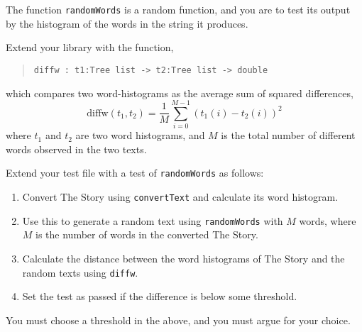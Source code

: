 The function \lstinline{randomWords} is a random function, and you are
to test its output by the histogram of the words in the string it
produces.

Extend your library with the function,
\begin{quote}
  \mbox{\lstinline!diffw : t1:Tree list -> t2:Tree list -> double!}
\end{quote}
which compares two word-histograms as the average sum of squared differences,
\begin{equation}
  \text{diffw}(t_1, t_2) = \frac{1}{M}\sum_{i=0}^{M-1}\left(t_1(i) - t_2(i)\right)^2
\end{equation}
where $t_1$ and $t_2$ are two word histograms, and $M$ is the total
number of different words observed in the two texts.

Extend your test file with a test of \lstinline{randomWords}
as follows:
\begin{enumerate}
\item Convert The Story using \lstinline{convertText} and calculate
  its word histogram.
\item Use this to generate a random text using \lstinline{randomWords} with
  $M$ words, where $M$ is the number of words in the converted The Story.
\item Calculate the distance between the word histograms of The Story
  and the random texts using \lstinline{diffw}.
\item Set the test as passed if the difference is below some threshold.
\end{enumerate}
You must choose a threshold in the above, and you must argue for your choice.
